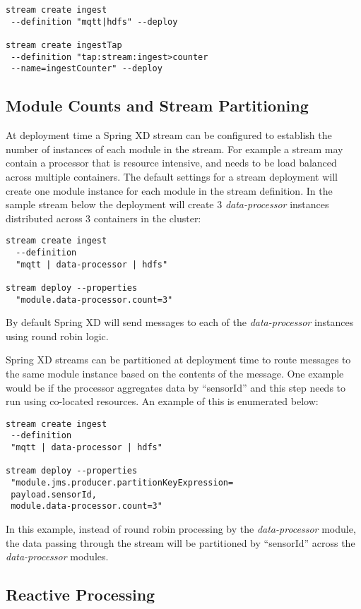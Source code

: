 \begin{lstlisting}
stream create ingest
 --definition "mqtt|hdfs" --deploy

stream create ingestTap
 --definition "tap:stream:ingest>counter
 --name=ingestCounter" --deploy
\end{lstlisting}

\subsection {Module Counts and Stream Partitioning}
At deployment time a Spring XD stream can be configured to establish the number
of instances of each module in the stream. For example a stream may contain
a processor that is resource intensive, and needs to be
load balanced across multiple containers. The default
settings for a stream deployment will create one module instance for each
module in the stream definition. In the sample stream below the
deployment will create 3 \emph{data-processor} instances distributed
across 3 containers in the cluster:

\begin{lstlisting}
stream create ingest
  --definition
  "mqtt | data-processor | hdfs"

stream deploy --properties
  "module.data-processor.count=3"
\end{lstlisting}

By default Spring XD will send messages to each of the \emph{data-processor}
instances using round robin logic.

Spring XD streams can be partitioned at deployment time to route messages to the
same module instance based on the contents of the message. One example
would be if the processor aggregates data by ``sensorId'' and this step needs to
run using co-located resources.  An example of this is enumerated below:

\begin{lstlisting}
stream create ingest
 --definition
 "mqtt | data-processor | hdfs"

stream deploy --properties
 "module.jms.producer.partitionKeyExpression=
 payload.sensorId,
 module.data-processor.count=3"
\end{lstlisting}

In this example, instead of round robin processing by the \emph{data-processor}
module, the data passing through the stream will be partitioned by ``sensorId''
across the \emph{data-processor} modules.

\subsection {Reactive Processing}


